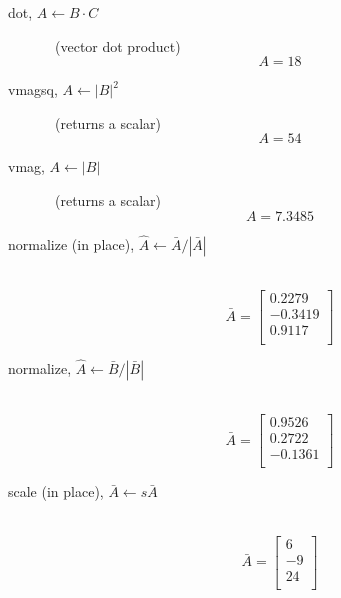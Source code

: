 \begin{description}
  \item[dot, $A \leftarrow B \cdot C$]\ (vector dot product) \newline
   \begin{equation}\nonumber
   A = 18
   \end{equation}

  \item[vmagsq, $A \leftarrow |B|^2$]\ (returns a scalar)\newline
   \begin{equation}\nonumber
   A = 54
   \end{equation}

  \item[vmag, $A \leftarrow |B|$]\ (returns a scalar)\newline
   \begin{equation}\nonumber
   A = 7.3485
   \end{equation}

  \item[normalize (in place), $\hat{A} \leftarrow \bar{A}/|\bar{A}|$]\ \newline
   \begin{equation}\nonumber
   \bar{A} = \left[
   \begin{array}{r}
     0.2279 \\
    -0.3419 \\
     0.9117 \\
   \end{array}\right]
   \end{equation}

  \item[normalize, $\hat{A} \leftarrow \bar{B}/|\bar{B}|$]\ \newline
   \begin{equation}\nonumber
   \bar{A} = \left[
   \begin{array}{r}
     0.9526 \\
     0.2722 \\
    -0.1361 \\
   \end{array}\right]
   \end{equation}

  \item[scale (in place), $\bar{A} \leftarrow s\bar{A}$]\ \newline
   \begin{equation}\nonumber
   \bar{A} = \left[
   \begin{array}{r}
      6  \\
     -9  \\
      24 \\
   \end{array}\right]
   \end{equation}


\end{description}

